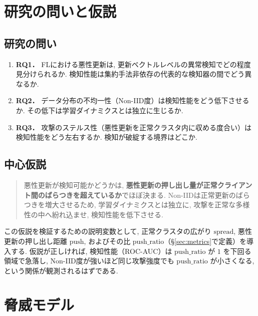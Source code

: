 \documentclass[a4j, twocolumn, dvipdfmx]{jsarticle}
\begin{document}
\section{研究の問いと仮説}

\subsection{研究の問い}

\begin{enumerate}
  \item \textbf{RQ1．} FLにおける悪性更新は, 更新ベクトルレベルの異常検知でどの程度見分けられるか. 検知性能は集約手法非依存の代表的な検知器の間でどう異なるか.
  \item \textbf{RQ2．} データ分布の不均一性（Non-IID度）は検知性能をどう低下させるか. その低下は学習ダイナミクスとは独立に生じるか.
  \item \textbf{RQ3．} 攻撃のステルス性（悪性更新を正常クラスタ内に収める度合い）は検知性能をどう左右するか. 検知が破綻する境界はどこか.
\end{enumerate}

\subsection{中心仮説}

\begin{quote}
悪性更新が検知可能かどうかは, \textbf{悪性更新の押し出し量が正常クライアント間のばらつきを超えているか}でほぼ決まる. Non-IIDは正常更新のばらつきを増大させるため, 学習ダイナミクスとは独立に, 攻撃を正常な多様性の中へ紛れ込ませ, 検知性能を低下させる.
\end{quote}

この仮説を検証するための説明変数として, 正常クラスタの広がり $\mathrm{spread}$, 悪性更新の押し出し距離 $\mathrm{push}$, およびその比 $\mathrm{push\_ratio}$（\S\ref{sec:metrics}で定義）を導入する. 仮説が正しければ, 検知性能（ROC-AUC）は $\mathrm{push\_ratio}$ が $1$ を下回る領域で急落し, Non-IID度が強いほど同じ攻撃強度でも $\mathrm{push\_ratio}$ が小さくなる, という関係が観測されるはずである.

\section{脅威モデル}
\label{sec:threat}
\end{document}
